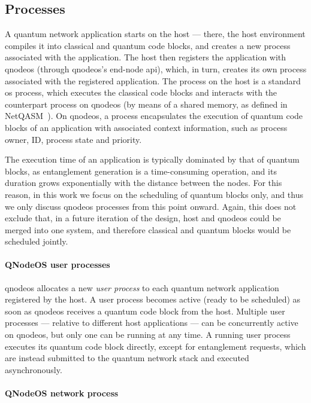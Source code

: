 \subsection{Processes}

A quantum network application starts on the host --- there, the host environment compiles it into
classical and quantum code blocks, and creates a new process associated with the application. The
host then registers the application with \acrshort{qnodeos} (through \acrshort{qnodeos}'s end-node
\acrshort{api}), which, in turn, creates its own process associated with the registered application.
The process on the host is a standard \acrshort{os} process, which executes the classical code
blocks and interacts with the counterpart process on \acrshort{qnodeos} (by means of a shared
memory, as defined in NetQASM~\cite{dahlberg_2022_netqasm}). On \acrshort{qnodeos}, a process
encapsulates the execution of quantum code blocks of an application with associated context
information, such as process owner, ID, process state and priority.

The execution time of an application is typically dominated by that of quantum blocks, as
entanglement generation is a time-consuming operation, and its duration grows exponentially with the
distance between the nodes. For this reason, in this work we focus on the scheduling of quantum
blocks only, and thus we only discuss \acrshort{qnodeos} processes from this point onward. Again,
this does not exclude that, in a future iteration of the design, host and \acrshort{qnodeos} could
be merged into one system, and therefore classical and quantum blocks would be scheduled jointly.

\paragraph{QNodeOS user processes}

\acrshort{qnodeos} allocates a new \emph{user process} to each quantum network application
registered by the host. A user process becomes active (ready to be scheduled) as soon as
\acrshort{qnodeos} receives a quantum code block from the host. Multiple user processes --- relative
to different host applications --- can be concurrently active on \acrshort{qnodeos}, but only one
can be running at any time. A running user process executes its quantum code block directly, except
for entanglement requests, which are instead submitted to the quantum network stack and executed
asynchronously.

\paragraph{QNodeOS network process}

